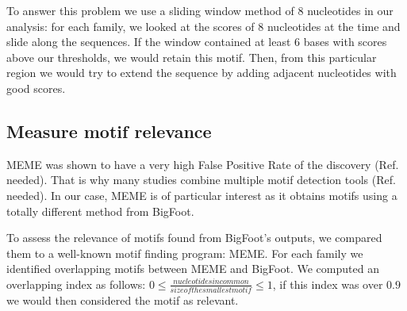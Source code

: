 To answer this problem we use a sliding window method of 8 nucleotides in our analysis: for each family, we looked at the scores of 8 nucleotides at the time and slide along the sequences. If the window contained at least 6 bases with scores above our thresholds, we would retain this motif. Then, from this particular region we would try to extend the sequence by adding adjacent nucleotides with good scores.



\subsection*{Measure motif relevance}

MEME was shown to have a very high False Positive Rate of the discovery (Ref. needed). That is why many studies combine multiple motif detection tools (Ref. needed). In our case, MEME is of particular interest as it obtains motifs using a totally different method from BigFoot.

To assess the relevance of motifs found from BigFoot's outputs, we compared them to a well-known motif finding program: MEME. For each family we identified overlapping motifs between MEME and BigFoot. We computed an overlapping index as follows: $0 \leq \frac{nucleotides in common}{size of the smallest motif} \leq 1$, if this index was over $0.9$ we would then considered the motif as relevant.